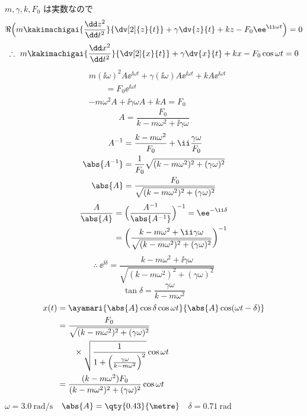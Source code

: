 $m,\gamma,k,F_{0}$ は実数なので
\[ \Re\Bigl(m\kakimachigai{\frac{\dd z^{2}}{\dd t^{2}}}{\dv[2]{z}{t}}+\gamma\dv{z}{t}+kz-F_{0}\ee^{\ii\omega t}\Bigr)=0 \]
\[ \therefore\ m\kakimachigai{\frac{\dd x^{2}}{\dd t^{2}}}{\dv[2]{x}{t}}+\gamma\dv{x}{t}+kx-F_{0}\cos\omega t=0 \]
\begin{align*}
&m(\ii\omega)^{2}A\ee^{\ii\omega t}+\gamma(\ii\omega)A\ee^{\ii\omega t}+kA\ee^{\ii\omega t}\\
&\qquad=F_{0}\ee^{\ii\omega t}\\
&-m\omega^{2}A+\ii\gamma\omega A+kA=F_{0}
\end{align*}
\[ A=\frac{F_{0}}{k-m\omega^{2}+\ii\gamma\omega} \]
\begin{align*}
A^{-1}&=\frac{k-m\omega^{2}}{F_{0}}+\ii\frac{\gamma\omega}{F_{0}}\\
\abs{A^{-1}}&=\frac{1}{F_{0}}\sqrt{(k-m\omega^{2})^{2}+(\gamma\omega)^{2}}\\
\abs{A}&=\frac{F_{0}}{\sqrt{(k-m\omega^{2})^{2}+(\gamma\omega)^{2}}}
\end{align*}
\begin{align*}
\frac{A}{\abs{A}}&=\Bigl(\frac{A^{-1}}{\abs{A^{-1}}}\Bigr)^{-1}=\ee^{-\ii\delta}\\
&=\biggl(\frac{k-m\omega^{2}+\ii\gamma\omega}{\sqrt{(k-m\omega^{2})^{2}+(\gamma\omega)^{2}}}\biggr)^{-1}
\end{align*}
\[ \therefore\ \ee^{\ii\delta}=\frac{k-m\omega^{2}+\ii\gamma\omega}{\sqrt{(k-m\omega^{2})^{2}+(\gamma\omega)^{2}}} \]
\[ \tan\delta=\frac{\gamma\omega}{k-m\omega^{2}} \]
\begin{align*}
x(t)&=\ayamari{\abs{A}\cos\delta\cos\omega t}{\abs{A}\cos(\omega t-\delta)}\\
&=\frac{F_{0}}{\sqrt{(k-m\omega^{2})^{2}+(\gamma\omega)^{2}}}\\
&\qquad\times\sqrt{\frac{1}{1+\left(\frac{\gamma\omega}{k-m\omega^{2}}\right)^{2}}}\cos\omega t\\
&=\frac{(k-m\omega^{2})F_{0}}{(k-m\omega^{2})^{2}+(\gamma\omega)^{2}}\cos\omega t
\end{align*}
$\omega=\qty{3.0}{\radian\per\second}$　$\abs{A}=\qty{0.43}{\metre}$　$\delta=\qty{0.71}{\radian}$

